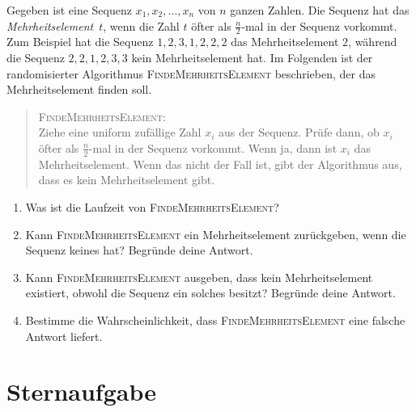 \documentclass{uebung_cs}
\begin{document}
\begin{aufgabe}[Mehrheit]
	Gegeben ist eine Sequenz $x_1,x_2,\dots,x_n$ von $n$ ganzen Zahlen. Die Sequenz hat das \textit{Mehrheitselement}~$t$, wenn die Zahl $t$ öfter als $\frac{n}{2}$-mal in der Sequenz vorkommt. Zum Beispiel hat die Sequenz $1,2,3,1,2,2,2$ das Mehrheitselement $2$, während die Sequenz $2,2,1,2,3,3$ kein Mehrheitselement hat. Im Folgenden ist der randomisierter Algorithmus \textsc{FindeMehrheitsElement} beschrieben, der das Mehrheitselement finden soll.
	
	\begin{quote}
		\textsc{FindeMehrheitsElement}: \\
		Ziehe eine uniform zufällige Zahl $x_i$ aus der Sequenz. Prüfe dann, ob $x_i$ öfter als $\frac{n}{2}$-mal in der Sequenz vorkommt. Wenn ja, dann ist $x_i$ das Mehrheitselement. Wenn das nicht der Fall ist, gibt der Algorithmus aus, dass es kein Mehrheitselement gibt.
	\end{quote}
	\begin{enumerate}
		\item Was ist die Laufzeit von \textsc{FindeMehrheitsElement}?
		\item Kann \textsc{FindeMehrheitsElement} ein Mehrheitselement zurückgeben, wenn die Sequenz keines hat? Begründe deine Antwort.
		\item Kann \textsc{FindeMehrheitsElement} ausgeben, dass kein Mehrheitselement existiert, obwohl die Sequenz ein solches besitzt? Begründe deine Antwort.
		\item Bestimme die Wahrscheinlichkeit, dass \textsc{FindeMehrheitsElement} eine falsche Antwort liefert.
	\end{enumerate}
\end{aufgabe}

\newpage
\section*{Sternaufgabe}
\end{document}
